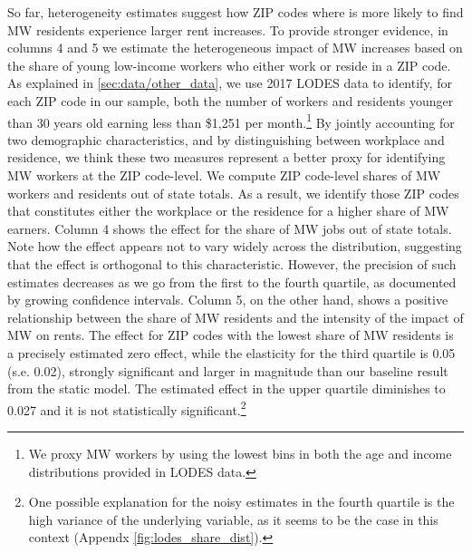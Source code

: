 

So far, heterogeneity estimates suggest how ZIP codes where is more likely to find MW residents experience 
larger rent increases. To provide stronger evidence, in columns 4 and 5 we estimate the heterogeneous
impact of MW increases based on the share of young low-income workers who either work or reside in a ZIP code.  
As explained in \autoref{sec:data/other_data}, we use 2017 LODES data to identify, for each ZIP code in our sample, 
both the number of workers and residents younger than 30 years old earning less than \$1,251 per month.\footnote{We 
proxy MW workers by using the lowest bins in both the age and income distributions provided in LODES data.} 
By jointly accounting for two demographic characteristics, and by distinguishing between workplace and residence, 
we think these two measures represent a better proxy for identifying MW workers at the ZIP code-level.
We compute ZIP code-level shares of MW workers and residents out of state totals. As a 
result, we identify those ZIP codes that constitutes either the workplace or the residence for a 
higher share of MW earners. Column 4 shows the effect for the share of MW jobs out of state totals. 
Note how the effect appears not to vary widely across the distribution, suggesting that the effect 
is orthogonal to this characteristic. However, the precision of such estimates decreases as we go 
from the first to the fourth quartile, as documented by growing confidence intervals. Column 5, on 
the other hand, shows a positive relationship between the share of MW residents and the intensity 
of the impact of MW on rents. The effect for ZIP codes with the lowest share of MW residents is a 
precisely estimated zero effect, while the elasticity for the third quartile is 0.05 (s.e. 
0.02), strongly significant and larger in magnitude than our baseline result from the static model. 
The estimated effect in the upper quartile diminishes to 0.027 and it is not statistically 
significant.\footnote{\label{ft:long_tail}  %
One possible explanation for the noisy estimates in the fourth quartile is the high variance of the 
underlying variable, as it seems to be the case in this context (Appendx \autoref{fig:lodes_share_dist}).}

